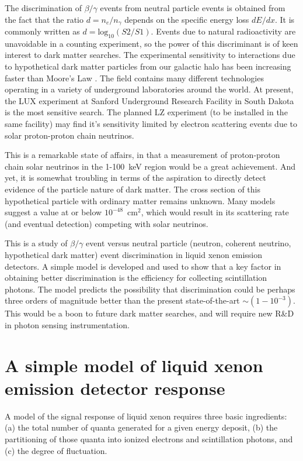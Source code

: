 \documentclass[article]{revtex4-1}[11pt]
\begin{document}
The discrimination of $\beta/\gamma$ events from neutral particle events is obtained from the fact that the ratio $d=n_e/n_{\gamma}$ depends on the specific energy loss $dE/dx$. It is commonly written as $d=\mbox{log}_{10}(S2/S1)$.  Events due to natural radioactivity are unavoidable in a counting experiment, so the power of this discriminant is of keen interest to dark matter searches. The experimental sensitivity to interactions due to hypothetical dark matter particles from our galactic halo has been increasing faster than Moore's Law \cite{}. The field contains many different technologies operating in a variety of underground laboratories around the world. At present, the LUX experiment at Sanford Underground Research Facility in South Dakota is the most sensitive search. The planned LZ experiment (to be installed in the same facility) may find it's sensitivity limited by electron scattering events due to solar proton-proton chain neutrinos.

This is a remarkable state of affairs, in that a measurement of proton-proton chain solar neutrinos in the 1-100~keV region would be a great achievement. And yet, it is somewhat troubling in terms of the aspiration to directly detect evidence of the particle nature of dark matter. The cross section of this hypothetical particle with ordinary matter remains unknown. Many models suggest a value at or below $10^{-48}$~cm$^2$, which would result in its scattering rate (and eventual detection) competing with solar neutrinos.

This is a study of $\beta/\gamma$ event versus neutral particle  (neutron, coherent neutrino, hypothetical dark matter) event discrimination in liquid xenon emission detectors. A simple model is developed and used to show that a key factor in obtaining better discrimination is the efficiency for collecting scintillation photons. The model predicts the possibility that discrimination could be perhaps three orders of magnitude better than the present state-of-the-art $\sim(1-10^{-3})$. This would be a boon to future dark matter searches, and will require new R\&D in photon sensing instrumentation.




\section{A simple model of liquid xenon emission detector response}\label{sec:model}
A model of the signal response of liquid xenon requires three basic ingredients: (a) the total number of quanta generated for a given energy deposit, (b) the partitioning of those quanta into ionized electrons and scintillation photons, and (c) the degree of fluctuation. %
\end{document}
